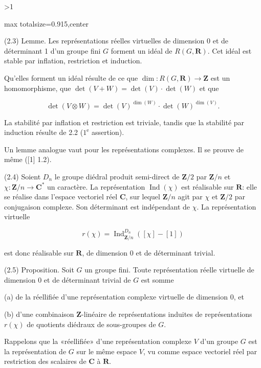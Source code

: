 \documentclass[9pt,twoside]{extarticle}
\newcommand{\EditionPage}[3]{%
  \ifnum#1>1\clearpage\fi
  \pdfbookmark[1]{Printed folio #2}{fr-folio-#2}%
  \hypertarget{fr-page-#1}{}%
  \noindent\begin{adjustbox}{max totalsize={\textwidth}{0.915\textheight},center}
  \begin{minipage}[t]{\textwidth}
  \fontsize{8.45}{10.05}\selectfont\justifying
  #3
  \end{minipage}
  \end{adjustbox}%
}
\begin{document}
\EditionPage{6}{304}{%
(2.3) Lemme. Les représentations réelles virtuelles de dimension 0 et de déterminant 1 d’un groupe fini \(G\) forment un idéal de \(R(G,\mathbf R)\). Cet idéal est stable par inflation, restriction et induction.\par

Qu’elles forment un idéal résulte de ce que \(\dim:R(G,\mathbf R)\to\mathbf Z\) est un homomorphisme, que \(\det(V+W)=\det(V)\cdot\det(W)\) et que\par

\[
\det(V\otimes W)=\det(V)^{\dim(W)}\cdot\det(W)^{\dim(V)}.
\]

La stabilité par inflation et restriction est triviale, tandis que la stabilité par induction résulte de 2.2 (\(1^{\mathrm e}\) assertion).\par

Un lemme analogue vaut pour les représentations complexes. Il se prouve de même ([1] 1.2).\par

(2.4) Soient \(D_n\) le groupe diédral produit semi-direct de \(\mathbf Z/2\) par \(\mathbf Z/n\) et \(\chi:\mathbf Z/n\to\mathbf C^*\) un caractère. La représentation \(\operatorname{Ind}(\chi)\) est réalisable sur \(\mathbf R\): elle se réalise dans l’espace vectoriel réel \(\mathbf C\), sur lequel \(\mathbf Z/n\) agit par \(\chi\) et \(\mathbf Z/2\) par conjugaison complexe. Son déterminant est indépendant de \(\chi\). La représentation virtuelle\par

\[
r(\chi)=\operatorname{Ind}_{\mathbf Z/n}^{D_n}([\chi]-[1])
\]

est donc réalisable sur \(\mathbf R\), de dimension 0 et de déterminant trivial.\par

(2.5) Proposition. Soit \(G\) un groupe fini. Toute représentation réelle virtuelle de dimension 0 et de déterminant trivial de \(G\) est somme\par

(a) de la réellifiée d’une représentation complexe virtuelle de dimension 0, et\par

(b) d’une combinaison \(\mathbf Z\)-linéaire de représentations induites de représentations \(r(\chi)\) de quotients diédraux de sous-groupes de \(G\).\par

Rappelons que la «réellifiée» d’une représentation complexe \(V\) d’un groupe \(G\) est la représentation de \(G\) sur le même espace \(V\), vu comme espace vectoriel réel par restriction des scalaires de \(\mathbf C\) à \(\mathbf R\).\par

}
\end{document}
